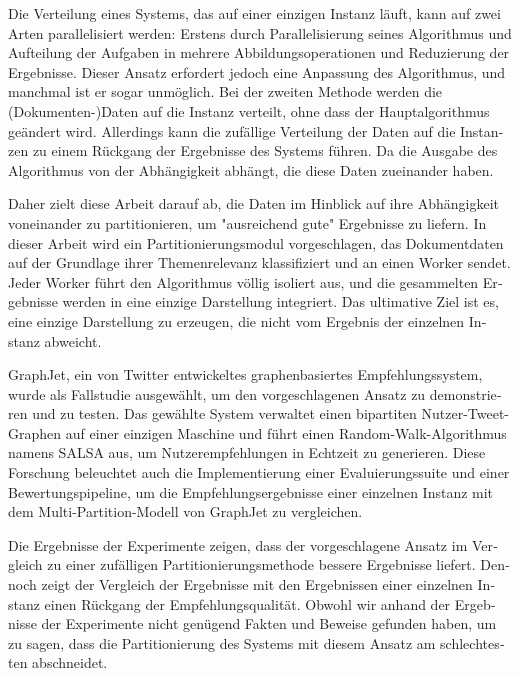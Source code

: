 \null\vfil
\begin{otherlanguage}{ngerman}
\begin{center}\textsf{\textbf{\abstractname}}\end{center}

\noindent 
Die Verteilung eines Systems, das auf einer einzigen Instanz läuft, kann auf zwei Arten parallelisiert werden: Erstens durch Parallelisierung seines Algorithmus und Aufteilung der Aufgaben in mehrere Abbildungsoperationen und Reduzierung der Ergebnisse. Dieser Ansatz erfordert jedoch eine Anpassung des Algorithmus, und manchmal ist er sogar unmöglich. Bei der zweiten Methode werden die (Dokumenten-)Daten auf die Instanz verteilt, ohne dass der Hauptalgorithmus geändert wird. Allerdings kann die zufällige Verteilung der Daten auf die Instanzen zu einem Rückgang der Ergebnisse des Systems führen. Da die Ausgabe des Algorithmus von der Abhängigkeit abhängt, die diese Daten zueinander haben.

Daher zielt diese Arbeit darauf ab, die Daten im Hinblick auf ihre Abhängigkeit voneinander zu partitionieren, um "ausreichend gute" Ergebnisse zu liefern. In dieser Arbeit wird ein Partitionierungsmodul vorgeschlagen, das Dokumentdaten auf der Grundlage ihrer Themenrelevanz klassifiziert und an einen Worker sendet. Jeder Worker führt den Algorithmus völlig isoliert aus, und die gesammelten Ergebnisse werden in eine einzige Darstellung integriert. Das ultimative Ziel ist es, eine einzige Darstellung zu erzeugen, die nicht vom Ergebnis der einzelnen Instanz abweicht.

GraphJet, ein von Twitter entwickeltes graphenbasiertes Empfehlungssystem, wurde als Fallstudie ausgewählt, um den vorgeschlagenen Ansatz zu demonstrieren und zu testen. Das gewählte System verwaltet einen bipartiten Nutzer-Tweet-Graphen auf einer einzigen Maschine und führt einen Random-Walk-Algorithmus namens SALSA aus, um Nutzerempfehlungen in Echtzeit zu generieren. Diese Forschung beleuchtet auch die Implementierung einer Evaluierungssuite und einer Bewertungspipeline, um die Empfehlungsergebnisse einer einzelnen Instanz mit dem Multi-Partition-Modell von GraphJet zu vergleichen.


Die Ergebnisse der Experimente zeigen, dass der vorgeschlagene Ansatz im Vergleich zu einer zufälligen Partitionierungsmethode bessere Ergebnisse liefert. Dennoch zeigt der Vergleich der Ergebnisse mit den Ergebnissen einer einzelnen Instanz einen Rückgang der Empfehlungsqualität. Obwohl wir anhand der Ergebnisse der Experimente nicht genügend Fakten und Beweise gefunden haben, um zu sagen, dass die Partitionierung des Systems mit diesem Ansatz am schlechtesten abschneidet.

\end{otherlanguage}
\vfil\null



